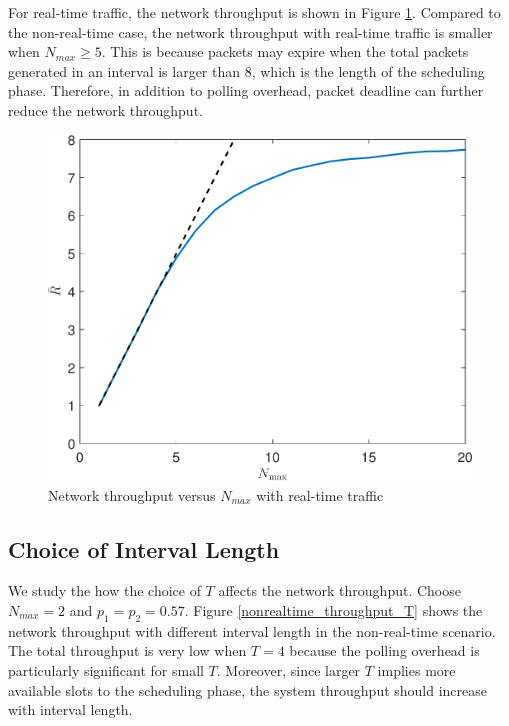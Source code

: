 \documentclass{article}
\begin{document}
For real-time traffic, the network throughput is shown in Figure \ref{realtime_throughput_randmax}. Compared to the non-real-time case, the network throughput with real-time traffic is smaller when $N_{max}\geq 5$. This is because packets may expire when the total packets generated in an interval is larger than 8, which is the length of the scheduling phase. Therefore, in addition to polling overhead, packet deadline can further reduce the network throughput. 

\begin{figure}[htbp]
\centering
\includegraphics[scale=0.5]{realtime_throughput_randmax.pdf}
\caption{Network throughput versus $N_{max}$ with real-time traffic}
\label{realtime_throughput_randmax}
\end{figure}

\subsection{Choice of Interval Length}
We study the how the choice of $T$ affects the network throughput. Choose $N_{max}=2$ and $p_1 = p_2 = 0.57$. Figure \ref{nonrealtime_throughput_T} shows the network throughput with different interval length in the non-real-time scenario. The total throughput is very low when $T=4$ because the polling overhead is particularly significant for small $T$. Moreover, since larger $T$ implies more available slots to the scheduling phase, the system throughput should increase with interval length. 

\end{document}
